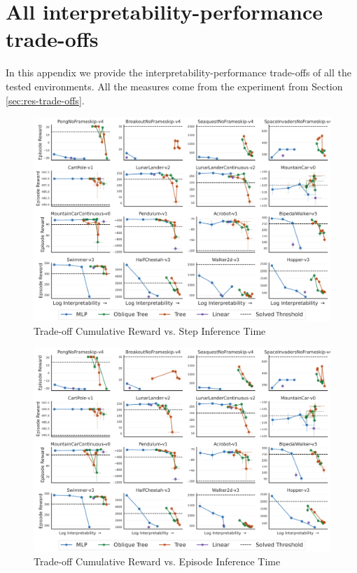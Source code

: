 \section{All interpretability-performance trade-offs}
In this appendix we provide the interpretability-performance trade-offs of all the tested environments. All the measures come from the experiment from Section \ref{sec:res-trade-offs}.

\begin{figure}
    \centering
    \includegraphics[width=1\linewidth]{images/images_part3/trade_off_step_times.pdf}
    \caption{Trade-off Cumulative Reward vs. Step Inference Time}
    \label{fig:trade-off}
\end{figure}

\begin{figure}[ht]
    \centering
    \includegraphics[width=0.95\linewidth]{images/images_part3/trade_off.pdf}
    \caption{Trade-off Cumulative Reward vs. Episode Inference Time}
    \label{fig:trade-off-episode}
\end{figure}

